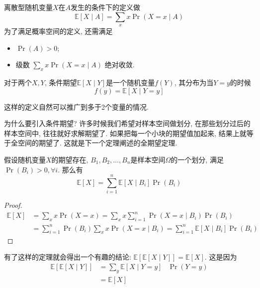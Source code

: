 \documentclass{ctexart}
\begin{document}
\begin{definition}[条件期望]
    离散型随机变量$X$在$A$发生的条件下的定义做
    $$
\mathbb{E}[X \mid A]=\sum_x x \operatorname{Pr}(X=x \mid A)
$$
为了满足概率空间的定义, 还需满足
\begin{itemize}
    \item $\operatorname{Pr}(A)>0$;
    \item 级数 $\sum_x x \operatorname{Pr}(X=x \mid A)$ 绝对收敛. 
\end{itemize}
\end{definition}

\begin{definition}[条件期望]
    对于两个$X, Y$, 条件期望$\mathbb{E}[X \mid Y]$是一个随机变量$f(Y)$, 其分布为当$Y=y$的时候
    $$
f(y)=\mathbb{E}[X \mid Y=y]
$$
\end{definition}

这样的定义自然可以推广到多于2个变量的情况. 

为什么要引入条件期望? 许多时候我们希望对样本空间做划分, 在那些划分过后的样本空间中, 往往就好求解期望了. 如果把每一个小块的期望值加起来, 结果上就等于全空间的期望了. 这就是下一个定理阐述的全期望定理. 

\begin{theorem}[全期望定理]
    假设随机变量$X$的期望存在, $B_1, B_2, \ldots, B_n$是样本空间$\Omega$的一个划分, 满足$\operatorname{Pr}\left(B_i\right)>0, \forall i$. 
    那么有
    $$
\mathbb{E}[X]=\sum_{i=1}^n \mathbb{E}\left[X \mid B_i\right] \operatorname{Pr}\left(B_i\right)
$$

\end{theorem}

\begin{proof}
    $$
\begin{aligned}
\mathbb{E}[X] & =\sum_x x \operatorname{Pr}(X=x)=\sum_x x \sum_{i=1}^n \operatorname{Pr}\left(X=x \mid B_i\right) \operatorname{Pr}\left(B_i\right) \\
& =\sum_{i=1}^n \operatorname{Pr}\left(B_i\right) \sum_x x \operatorname{Pr}\left(X=x \mid B_i\right)=\sum_{i=1}^n \mathbb{E}\left[X \mid B_i\right] \operatorname{Pr}\left(B_i\right)
\end{aligned}
$$
\end{proof}

有了这样的定理就会得出一个有趣的结论: $\mathbb{E}[\mathbb{E}[X \mid Y]]=\mathbb{E}[X]$. 这是因为
$$
\begin{array}{rlr}
\mathbb{E}[\mathbb{E}[X \mid Y]] & =\sum_y \mathbb{E}[X \mid Y=y] & \operatorname{Pr}(Y=y) \\
& =\mathbb{E}[X] \end{array}
$$
\end{document}
